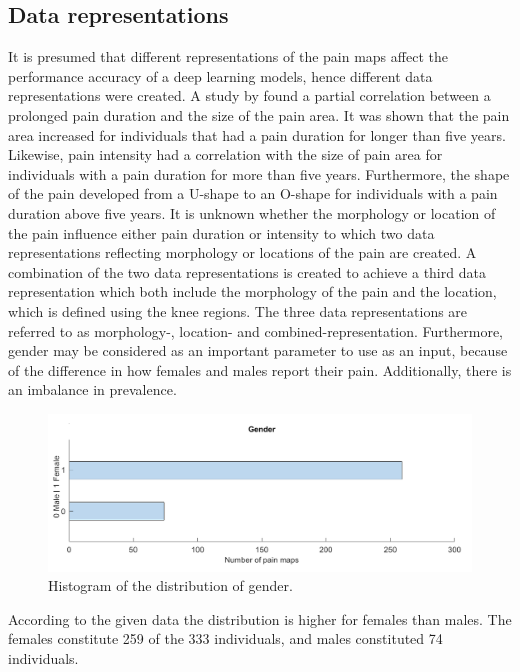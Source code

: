\subsection{Data representations} \label{sec:representation}
It is presumed that different representations of the pain maps affect the performance accuracy of a deep learning models, hence different data representations were created.
A study by \citeauthor{Boudreau2017} \citep{Boudreau2017} found a partial correlation between a prolonged pain duration and the size of the pain area. It was shown that the pain area increased for individuals that had a pain duration for longer than five years. Likewise, pain intensity had a correlation with the size of pain area for individuals with a pain duration for more than five years. Furthermore, the shape of the pain developed from a U-shape to an O-shape for individuals with a pain duration above five years.\citep{Boudreau2017} \newline
\noindent
It is unknown whether the morphology or location of the pain influence either pain duration or intensity to which two data representations reflecting morphology or locations of the pain are created.
A combination of the two data representations is created to achieve a third data representation which both include the morphology of the pain and the location, which is defined using the knee regions. The three data representations are referred to as morphology-, location- and combined-representation.
\noindent
Furthermore, gender may be considered as an important parameter to use as an input, because of the difference in how females and males report their pain. Additionally, there is an imbalance in prevalence.

\begin{figure} [H]
\centering
\includegraphics[width=1\textwidth]{figures/histoGender}
\caption{Histogram of the distribution of gender.}
\label{fig:histogender}
\end{figure}

\noindent
According to the given data the distribution is higher for females than males. The females constitute 259 of the 333 individuals, and males constituted 74 individuals.  \newline

